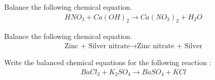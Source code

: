 \item     Balance the following chemical equation.
    \begin{align}
        \label{eq:solutions/chem/6ato balance} HNO_{3}+ Ca(OH)_{2}\to Ca(NO_{3})_{2}+H_{2}O
    \end{align}

\solution

%
\item    Balance the following chemical equation.
    \begin{align}
        \label{eq:solutions/chem/7b1} \text{Zinc + Silver nitrate} \to \text{Zinc nitrate + Silver}
    \end{align}
\solution


\item Write the balanced chemical equations for the following reaction :
\begin{align}
 BaCl_2 + K_2SO_4 \rightarrow BaSO_4 + KCl \label{eq:solutions/chemistry/7d:1}   
\end{align}
\solution

%

